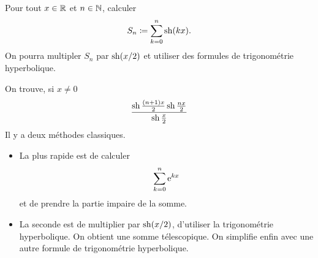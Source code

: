 \documentclass{magnolia}
\begin{document}
\begin{exoUnique}
\exemple Pour tout $x\in\mathbb{R}$ et $n\in\mathbb{N}$, calculer
  \[S_n\coloneqq\sum_{k=0}^n \operatorname{sh}(kx).\]
  On pourra multipler $S_n$ par $\operatorname{sh}(x/2)$ et utiliser des formules de trigonométrie
  hyperbolique.
  \begin{sol}
  On trouve, si $x\neq 0$
  \[\frac{\operatorname{sh}\frac{(n+1)x}{2}\operatorname{sh}\frac{nx}{2}}{\operatorname{sh}\frac{x}{2}}\]
  Il y a deux méthodes classiques.
  \begin{itemize}
\item La plus rapide est de calculer
  \[\sum_{k=0}^n {\rm e}^{kx}\]
  et de prendre la partie impaire de la somme.
\item La seconde est de multiplier par $\operatorname{sh}(x/2)$, d'utiliser la trigonométrie hyperbolique. On obtient une somme télescopique. On simplifie enfin avec une autre formule de trigonométrie hyperbolique.
  \end{itemize}
  \end{sol}
\end{exoUnique}
\end{document}
